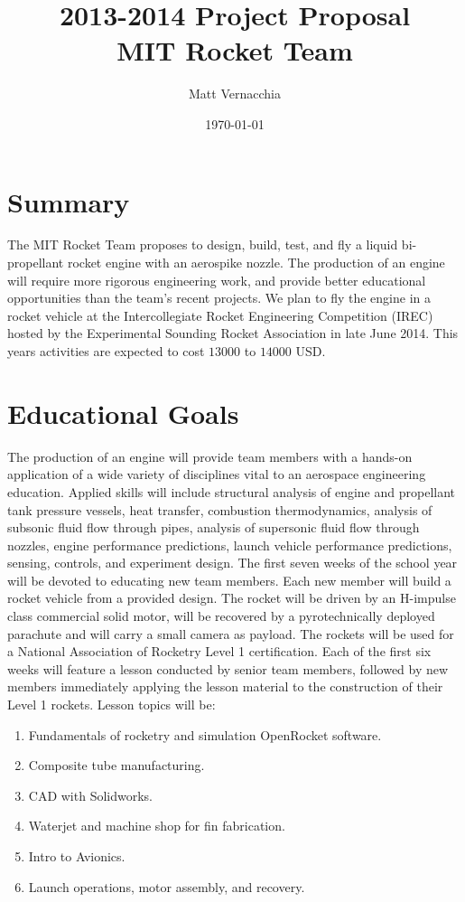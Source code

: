 \documentclass{article}
\title{ 2013-2014 Project Proposal \\ MIT Rocket Team} %
\author{Matt Vernacchia} %
\date{ \today } %
\begin{document}
\maketitle
\section*{Summary}
The MIT Rocket Team proposes to design, build, test, and fly a liquid bi-propellant rocket engine with an aerospike nozzle.
The production of an engine will require more rigorous engineering work, and provide better educational opportunities than the team's recent projects. We plan to fly the engine in a rocket vehicle at the Intercollegiate Rocket Engineering Competition (IREC) hosted by the Experimental Sounding Rocket Association in late June 2014. This years activities are expected to cost $13000$ to $14000$ USD.
\section*{Educational Goals}
The production of an engine will provide team members with a hands-on application of a wide variety of disciplines vital to an aerospace engineering education. Applied skills will include structural analysis of engine and propellant tank pressure vessels, heat transfer, combustion thermodynamics, analysis of subsonic fluid flow through pipes, analysis of supersonic fluid flow through nozzles, engine performance predictions, launch vehicle performance predictions, sensing, controls, and experiment design.
The first seven weeks of the school year will be devoted to educating new team members. Each new member will build a rocket vehicle from a provided design. The rocket will be driven by an H-impulse class commercial solid motor, will be recovered by a pyrotechnically deployed parachute and will carry a small camera as payload. The rockets will be used for a National Association of Rocketry Level 1 certification. Each of the first six weeks will feature a lesson conducted by senior team members, followed by new members immediately applying the lesson material to the construction of their Level 1 rockets. Lesson topics will be:
\begin{enumerate}
\item Fundamentals of rocketry and simulation OpenRocket software.
\item Composite tube manufacturing.
\item CAD with Solidworks.
\item Waterjet and machine shop for fin fabrication.
\item Intro to Avionics.
\item Launch operations, motor assembly, and recovery.
\end{enumerate}
\end{document}
